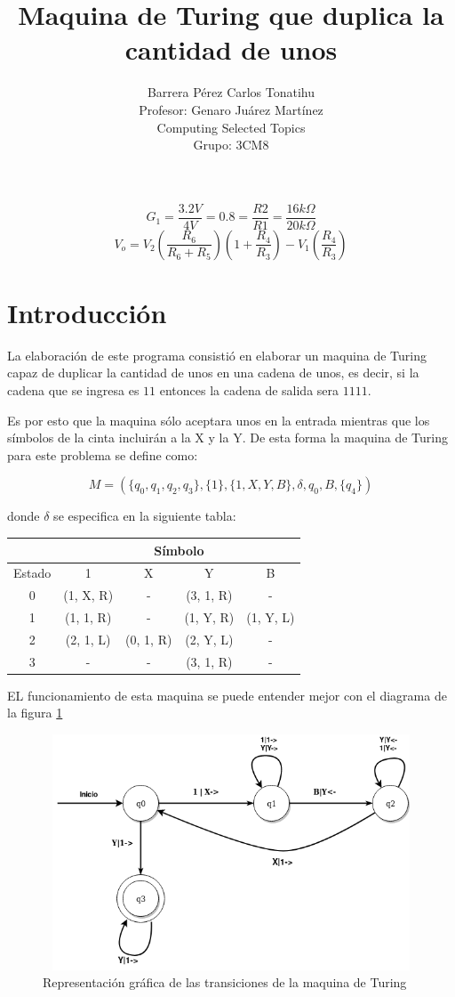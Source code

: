 \documentclass[a4paper,12pt]{article}
\title{Maquina de Turing que duplica la cantidad de unos}
\author{Barrera Pérez Carlos Tonatihu \\ Profesor: Genaro Juárez Martínez \\ Computing Selected Topics \\ Grupo: 3CM8 }
\begin{document}
\maketitle
\[ G_{1} = \frac{3.2 V}{4 V} = 0.8 = \frac{R2}{R1} = \frac{16 k\Omega}{20 k\Omega} \]
\[ V_{o} = V_{2}(\frac{R_{6}}{R_{6}+R_{5}})(1+\frac{R_{4}}{R_{3}}) - V_{1}(\frac{R_{4}}{R_{3}}) \]


\newpage
\tableofcontents
\newpage
\section{Introducción}
La elaboración de este programa consistió en elaborar un maquina de Turing capaz de duplicar la cantidad de unos en una cadena de unos, es decir, si la cadena que se ingresa es $ 11 $ entonces la cadena de salida sera $ 1111 $.

Es por esto que la maquina sólo aceptara unos en la entrada mientras que los símbolos de la cinta incluirán a la X y la Y. De esta forma la maquina de Turing para este problema se define como:

\[M=(\lbrace q_{0}, q_{1}, q_{2}, q_{3}\rbrace, \lbrace 1 \rbrace, \lbrace 1, X, Y, B \rbrace, \delta, q_{0}, B, \lbrace q_{4} \rbrace)\]

donde $ \delta $ se especifica en la siguiente tabla:
\begin{center}
\begin{tabular}{|c|c|c|c|c|}
\hline
& \multicolumn{4}{|c|}{Símbolo} \\ \hline
Estado & 1 & X & Y & B\\ \hline
0 & (1, X, R) & - & (3, 1, R) & -\\ \hline
1 & (1, 1, R) & - & (1, Y, R) & (1, Y, L)\\ \hline
2 & (2, 1, L) & (0, 1, R) & (2, Y, L) & -\\ \hline
3 & - & - & (3, 1, R) & - \\ \hline
\end{tabular}
\end{center}

EL funcionamiento de esta maquina se puede entender mejor con el diagrama de la figura \ref{fig:diagrama}

\begin{figure}[H]
\begin{center}
 \includegraphics[width=12cm, height=7cm]{Turing-unos.png}
 \caption{Representación gráfica de las transiciones de la maquina de Turing}
 \label{fig:diagrama}
\end{center}
\end{figure}
\end{document}
